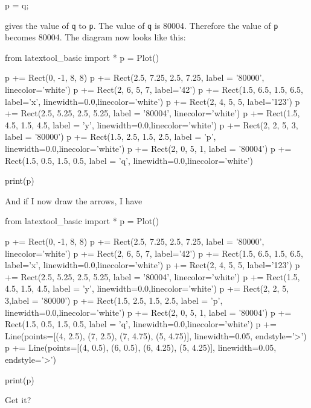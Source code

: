 \begin{consolethree}[escapeinside=||]
p = q;
\end{consolethree}

gives the value of \texttt{q} to \texttt{p}. The value of \texttt{q} is 80004.
Therefore the value of \texttt{p} becomes 80004. The diagram now looks like this:
\begin{python}
from latextool_basic import *
p = Plot()

p += Rect(0, -1, 8, 8)
p += Rect(2.5, 7.25, 2.5, 7.25, label = '80000', linecolor='white')
p += Rect(2, 6, 5, 7, label='42')
p += Rect(1.5, 6.5, 1.5, 6.5, label='x', linewidth=0.0,linecolor='white')
p += Rect(2, 4, 5, 5, label='123')
p += Rect(2.5, 5.25, 2.5, 5.25, label = '80004', linecolor='white')
p += Rect(1.5, 4.5, 1.5, 4.5, label = 'y', linewidth=0.0,linecolor='white')
p += Rect(2, 2, 5, 3, label = '80000')
p += Rect(1.5, 2.5, 1.5, 2.5, label = 'p', linewidth=0.0,linecolor='white')
p += Rect(2, 0, 5, 1, label = '80004')
p += Rect(1.5, 0.5, 1.5, 0.5, label = 'q', linewidth=0.0,linecolor='white')

print(p)
\end{python}

And if I now draw the arrows, I have

\begin{python}
from latextool_basic import *
p = Plot()

p += Rect(0, -1, 8, 8)
p += Rect(2.5, 7.25, 2.5, 7.25, label = '80000', linecolor='white')
p += Rect(2, 6, 5, 7, label='42')
p += Rect(1.5, 6.5, 1.5, 6.5, label='x', linewidth=0.0,linecolor='white')
p += Rect(2, 4, 5, 5, label='123')
p += Rect(2.5, 5.25, 2.5, 5.25, label = '80004', linecolor='white')
p += Rect(1.5, 4.5, 1.5, 4.5, label = 'y', linewidth=0.0,linecolor='white')
p += Rect(2, 2, 5, 3,label = '80000')
p += Rect(1.5, 2.5, 1.5, 2.5, label = 'p', linewidth=0.0,linecolor='white')
p += Rect(2, 0, 5, 1, label = '80004')
p += Rect(1.5, 0.5, 1.5, 0.5, label = 'q', linewidth=0.0,linecolor='white')
p += Line(points=[(4, 2.5), (7, 2.5), (7, 4.75), (5, 4.75)], linewidth=0.05, endstyle='>')
p += Line(points=[(4, 0.5), (6, 0.5), (6, 4.25), (5, 4.25)], linewidth=0.05, endstyle='>')

print(p)
\end{python}

Get it?






\newpage{}

